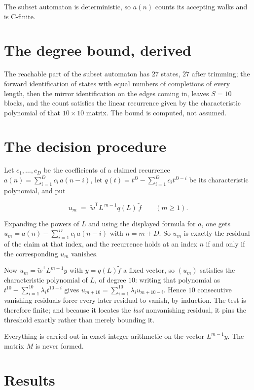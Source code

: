 \documentclass[11pt]{article}
\theoremstyle{definition}
\begin{document}
The subset automaton is deterministic, so $a(n)$ counts its accepting walks and is C-finite.

\section{The degree bound, derived}

The reachable part of the subset automaton has $27$ states, $27$ after trimming; the forward identification of states with equal numbers of completions of every length, then the mirror identification on the edges coming in, leaves $S = 10$ blocks, and the count satisfies the linear recurrence given by the characteristic polynomial of that $10\times10$ matrix. The bound is computed, not assumed.

\section{The decision procedure}

Let $c_1,\dots,c_D$ be the coefficients of a claimed recurrence $a(n) = \sum_{i=1}^{D} c_i\,a(n-i)$, let $q(t) = t^{D} - \sum_{i=1}^{D} c_i t^{D-i}$ be its characteristic polynomial, and put

\[u_m \;=\; \tilde w^{\mathsf T} L^{\,m-1} q(L)\,\tilde f \qquad (m \ge 1).\]

Expanding the powers of $L$ and using the displayed formula for $a$, one gets $u_m = a(n) - \sum_{i=1}^{D} c_i\,a(n-i)$ with $n = m + D$. So $u_m$ is exactly the residual of the claim at that index, and the recurrence holds at an index $n$ if and only if the corresponding $u_m$ vanishes.

Now $u_m = \tilde w^{\mathsf T} L^{m-1} y$ with $y = q(L)\tilde f$ a fixed vector, so $(u_m)$ satisfies the characteristic polynomial of $L$, of degree $10$: writing that polynomial as $t^{10} - \sum_{i=1}^{10} \lambda_i t^{10-i}$ gives $u_{m+10} = \sum_{i=1}^{10} \lambda_i u_{m+10-i}$. Hence $10$ consecutive vanishing residuals force every later residual to vanish, by induction. The test is therefore finite; and because it locates the {\itshape last} nonvanishing residual, it pins the threshold exactly rather than merely bounding it.

Everything is carried out in exact integer arithmetic on the vector $L^{m-1}y$. The matrix $M$ is never formed.

\section{Results}
\end{document}
